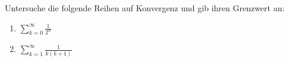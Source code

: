 \begin{exercise}[Reihen]
  Untersuche die folgende Reihen auf Konvergenz und gib ihren Grenzwert an:
  \begin{enumerate}
  \item $\displaystyle \sum_{k = 0}^\infty \frac{1}{2^n}$
  \item $\displaystyle \sum_{k = 1}^\infty \frac{1}{k (k + 1)}$
  \end{enumerate}
\end{exercise}

